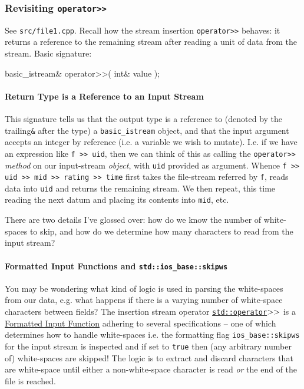 \documentclass[12pt,letterpaper,twoside]{article}
\begin{document}
\subsubsection{Revisiting \texttt{operator>>}}
See \texttt{src/file1.cpp}. Recall 
how the stream insertion \texttt{operator>>} 
behaves: it returns a reference to the remaining stream after reading a unit of data 
from the stream. Basic signature:

\begin{cpp}
basic_istream& operator>>( int& value );
\end{cpp}

\paragraph{Return Type is a Reference to an Input Stream}
This signature tells us that the output type is a reference to (denoted by the trailing\texttt{\&} after the type) a \texttt{basic\_istream} object, and that the input argument 
accepts an integer by reference (i.e. a variable we wish to mutate).
I.e. if we have an expression like \texttt{f >> uid}, then we can think of this as
calling the \texttt{operator>>} \emph{method} on our input-stream \emph{object}, with 
\texttt{uid} provided as argument.
Whence \texttt{f >> uid >> mid >> rating >> time} first takes the 
file-stream referred by 
\texttt{f}, reads data into \texttt{uid} and returns the remaining stream. 
We then repeat, this time reading the next datum and placing its contents into \texttt{mid}, etc. 

There are two details I've glossed over: how do we know the number of white-spaces to skip,
and how do we determine how many characters to read from the input stream?

\paragraph{Formatted Input Functions and \texttt{std::ios\_base::skipws}} 
You may be wondering what kind of logic is used in 
parsing the white-spaces from our data, e.g. what happens if there is a varying number of 
white-space characters between fields? The insertion stream operator 
\href{https://en.cppreference.com/w/cpp/io/basic_istream/operator_gtgt}
{\texttt{std::operator$>\vspace{-1pt}>$}} is a \href{https://en.cppreference.com/w/cpp/named_req/FormattedInputFunction}{Formatted Input Function} adhering to several specifications -- one of which determines how to handle white-spaces i.e. the formatting flag 
\texttt{ios\_base::skipws} for the input stream is inspected and if set to \texttt{true} 
then (any arbitrary number of) white-spaces are skipped! The logic is to extract and 
discard characters that are 
white-space until either a non-white-space character is read \emph{or} the end of the 
file is reached.
\end{document}
